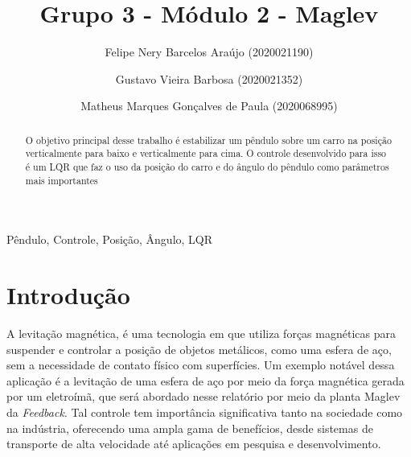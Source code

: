 \documentclass{ifacconf}
\begin{document}
\begin{frontmatter}

\title{Grupo 3 - Módulo 2 - Maglev} 


\author[First]{Felipe Nery Barcelos Araújo (2020021190)} 
\author[First]{Gustavo Vieira Barbosa (2020021352)} 
\author[First]{Matheus Marques Gonçalves de Paula (2020068995)}

\address[First]{
  Engenharia de Controle e Automação,\\ Universidade Federal de Minas Gerais, MG \\
   (e-mails: felipenery@ufmg.br, gustavovbarbosa@ufmg.br, mmgp@ufmg.br)
}

\begin{abstract}               
  O objetivo principal desse trabalho é estabilizar um pêndulo sobre um carro na
  posição verticalmente para baixo e verticalmente para cima. O controle desenvolvido para isso
  é um LQR que faz o uso da posição do carro e do ângulo do pêndulo como parâmetros mais importantes  
\end{abstract}

\begin{keyword}
Pêndulo, Controle, Posição, Ângulo, LQR 
\end{keyword}

\end{frontmatter}


\section{Introdução}

A levitação magnética, é uma tecnologia em que utiliza forças magnéticas para suspender e controlar a posição de
objetos metálicos, como uma esfera de aço, sem a necessidade de contato físico com superfícies. Um exemplo notável dessa aplicação é a levitação de uma esfera
de aço por meio da força magnética gerada por um eletroímã, que será abordado nesse relatório por meio da planta Maglev da \textit{Feedback}. Tal controle tem importância significativa 
tanto na sociedade como na indústria, oferecendo uma ampla gama de benefícios, desde sistemas de transporte de alta velocidade até aplicações em pesquisa e desenvolvimento.
\end{document}
